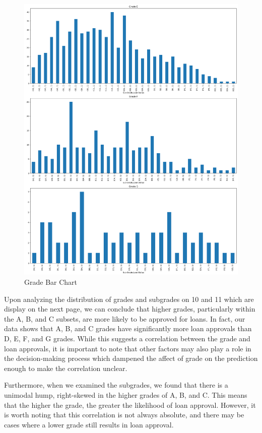 \documentclass[sigplan]{acmart}
\begin{document}
\begin{figure}
    \centering
    \includegraphics[width=\linewidth, height=\textheight]{images/grade-subgrade vs loan status-2.png}
    \caption{Grade Bar Chart}
\end{figure}

Upon analyzing the distribution of grades and subgrades on \figurename{10 and 11} which are display on the next page, we can conclude that higher grades, particularly within the A, B, and C subsets, are more likely to be approved for loans. In fact, our data shows that A, B, and C grades have significantly more loan approvals than D, E, F, and G grades. While this suggests a correlation between the grade and loan approvals, it is important to note that other factors may also play a role in the decision-making process which dampened the affect of grade on the prediction enough to make the correlation unclear.

Furthermore, when we examined the subgrades, we found that there is a unimodal hump, right-skewed in the higher grades of A, B, and C. This means that the higher the grade, the greater the likelihood of loan approval. However, it is worth noting that this correlation is not always absolute, and there may be cases where a lower grade still results in loan approval.
\end{document}
